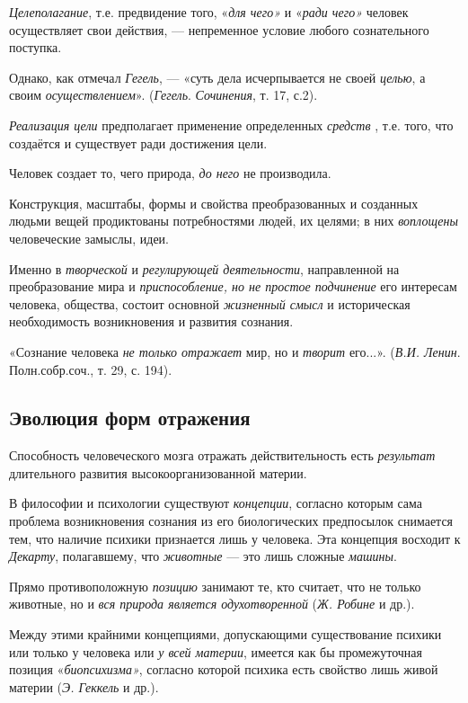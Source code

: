 \documentclass[a4paper,14pt,russian]{extreport}
\begin{document}
\emph{Целеполагание}, т.е. предвидение того, «\emph{для чего»} и «\emph{ради чего»} человек осуществляет свои действия, --- непременное условие любого сознательного поступка.

Однако, как отмечал \emph{Гегель}, --- «суть дела исчерпывается не своей \emph{целью}, а своим \emph{осуществлением}». (\emph{Гегель}. \emph{Сочинения}, т. 17, с.2).

\emph{Реализация цели} предполагает применение определенных \emph{средств} , т.е. того, что создаётся и существует ради достижения цели.

Человек создает то, чего природа, \emph{до него} не производила.

Конструкция, масштабы, формы и свойства преобразованных и созданных людьми вещей продиктованы потребностями людей, их целями; в них \emph{воплощены} человеческие замыслы, идеи.

Именно в \emph{творческой} и \emph{регулирующей деятельности}, направленной на преобразование мира и \emph{приспособление, но не простое подчинение} его интересам человека, общества, состоит основной \emph{жизненный смысл} и историческая необходимость возникновения и развития сознания.

«Сознание человека \emph{не только отражает} мир, но и \emph{творит} его...». (\emph{В.И. Ленин}. Полн.собр.соч., т. 29, с. 194).

\subsection{Эволюция форм отражения}

Способность человеческого мозга отражать действительность есть \emph{результат} длительного развития высокоорганизованной материи.

В философии и психологии существуют \emph{концепции}, согласно которым сама проблема возникновения сознания из его биологических предпосылок снимается тем, что наличие психики признается лишь у человека. Эта концепция восходит к \emph{Декарту}, полагавшему, что \emph{животные} --- это лишь сложные \emph{машины}.

Прямо противоположную \emph{позицию} занимают те, кто считает, что не только животные, но и \emph{вся природа является одухотворенной} (\emph{Ж. Робине} и др.).

Между этими крайними концепциями, допускающими существование психики или только у человека или \emph{у всей материи}, имеется как бы промежуточная позиция «\emph{биопсихизма»}, согласно которой психика есть свойство лишь живой материи (\emph{Э. Геккель} и др.).
\end{document}

